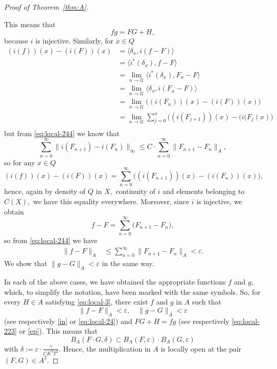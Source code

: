 \documentclass[12pt,fleqn]{amsart}
\theoremstyle{definition}
\numberwithin{equation}{section}
\theoremstyle{remark}
\newcommand{\e}{\varepsilon}
\begin{document}
\begin{proof}[Proof of Theorem~\ref{thm:A}]
\begin{itemize}
This means that 
\begin{equation}\label{ep}
    fg = FG + H,
\end{equation}
 because $i$ is injective. Similarly, for $x\in Q$
%
\begin{equation}\label{eq:local-233}
    \begin{split}
        (i(f))(x)-(i(F))(x)  &= 
         \langle \delta_x, i(f-F)\rangle\\
        &= 
           \langle i^*(\delta_x), f-F\rangle\\
        &= 
        \lim_{n\to\mathscr{U}} \langle i^*(\delta_x), F_{n}-F\rangle\\
        &= 
         \lim_{n\to\mathscr{U}} \langle \delta_x, i(F_{n}-F)\rangle\\
        &= 
        \lim_{n\to\mathscr{U}}\big( (i(F_{n}))(x)-(i(F))(x)\big)\\
        &= 
        \lim_{n\to\mathscr{U}}\sum_{j=0}^{n}\big( (i(F_{j+1}))(x)-(i(F_j(x)\big)\\
    \end{split}
\end{equation}
but from \eqref{eq:local-244} we know that
\[
    \sum_{n=0}^\infty \big\| i(F_{n+1})-i(F_n)\big\|_{\infty} \leqslant  C \cdot \sum_{n=0}^{\infty} \|F_{n+1}-F_n\|_{A}, 
\]
so for any $x\in Q$
\[
 (i(f))(x)-(i(F))(x) = \sum_{n=0}^\infty \big( (i(F_{n+1}))(x)-(i(F_n))(x)\big),
\]
hence, again by density of $Q$ in $X,$ continuity of $i$ and elements belonging to $C(X),$ we have this equality everywhere. Moreover, since $i$ is injective, we obtain
\[
    f-F = \sum_{n=0}^\infty \big( F_{n+1}-F_n\big),
\]
%
so from \eqref{eq:local-244} we have 
%
\begin{equation}\label{eq:local-24}
    \begin{split}
        \|f-F\|_{A}
        &\leqslant 
        \sum_{n=0}^\infty \|F_{n+1}-F_n\|_{A}
         < \e.
    \end{split}
\end{equation}
%
We show that $\|g-G\|_{A}<\e$ in the same way.
\end{itemize}

In each of the above cases, we have obtained the appropriate functions $f$ and $g$, which, to simplify the notation, have been marked with the same symbols. So, for every $H \in A$ satisfying \eqref{eq:local-3}, there 
exist $f$ and $g$ in $A$ such that 
\[
\|f-F\|_{A}<\e, \quad \|g-G\|_{A}<\e
\] 
(see respectively \eqref{in} or \eqref{eq:local-24}) and $FG + H = fg$ (see respectively \eqref{eq:local-223} or \eqref{ep}). 
This means that
%
\[
    B_{A}(F\cdot G,\delta)
    \subset 
    B_{A}(F,\e)\cdot B_{A}(G,\e)
\]
%
with $\delta:=\e\cdot \frac{\gamma}{C K^3 T^2}$. Hence, the multiplication in $A$ is locally open at the pair $(F,G)\in A^2$.


\end{proof}
\end{document}
